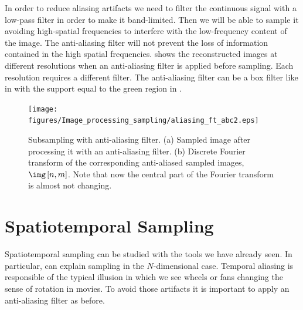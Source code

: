 In order to reduce aliasing artifacts we need to filter the continuous signal with a low-pass filter in order to make it band-limited. Then we will be able to sample it avoiding high-spatial frequencies to interfere with the low-frequency content of the image. The anti-aliasing filter will not prevent the loss of information contained in the high spatial frequencies.   shows the reconstructed images at different resolutions when an anti-aliasing filter is applied before sampling. Each resolution requires a different filter. The anti-aliasing filter can be a box filter like in \eqn{\ref{eq:boxfilterFT}} with the support equal to the green region in . 

\begin{figure}
\texttt{[image: figures/Image\_processing\_sampling/aliasing\_ft\_abc2.eps]}
\caption{Subsampling with anti-aliasing filter. (a) Sampled image after processing it with an anti-aliasing filter. (b) Discrete Fourier transform of the corresponding anti-aliased sampled images, $\img\left[n,m\right]$. Note that now the central part of the Fourier transform is almost not changing.
} 
\label{fig:aliasingFTzebra2}
\end{figure}


%
%
%
%
%
%
%
%
%
%


\section{Spatiotemporal Sampling}


Spatiotemporal sampling can be studied with the tools we have already seen. In particular, \eqn{\ref{eq:genericsampling}} can explain sampling in the $N$-dimensional case. Temporal aliasing is responsible of the typical illusion in which we see wheels or fans changing the sense of rotation in movies. To avoid those artifacts it is important to apply an anti-aliasing filter as before.


